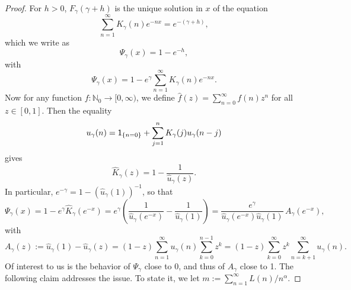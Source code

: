 \documentclass[AHL,Unicode,longabstracts]{cedram}
\newcommand{\bbN}{{\ensuremath{\mathbb N}}}
\newcommand{\ga}{\alpha}
\newcommand{\gga}{\gamma}
\newcommand{\ind}{{\sf 1}}
\newcommand{\hK}{\hat K}
\begin{document}
\begin{proof}
For $h > 0$, $F_\gga(\gga + h)$ is the unique solution in $x$ of the equation
\begin{equation}
\sum_{n=1}^\infty K_\gga(n) e^{- n x} = e^{- (\gga + h)},
\end{equation}
which we write as
\begin{equation}\label{FreeEnergyEquation}
\Psi_\gga(x) = 1 - e^{- h},
\end{equation}
with
\begin{equation}
\Psi_\gga(x) = 1 - e^\gga \sum_{n=1}^\infty K_\gga(n) e^{- n x}.
\end{equation}
Now for any function $f : \bbN_0 \to [0,\infty)$, we define $\hat f(z) = \sum_{n=0}^\infty f(n) z^n$ for all $z \in [0,1]$. Then the equality
\begin{equation}
u_\gga(n) = \ind_{\{n = 0\}} + \sum_{j=1}^n K_\gga(j) u_\gga(n-j)
\end{equation}
gives
\begin{equation}
\hK_\gga(z) = 1 - \frac{1}{\hat u_\gga(z)}.
\end{equation}
In particular, $e^{- \gga} = 1 - (\hat u_\gga(1))^{-1}$, so that
\begin{equation}\label{PsiAndA}
\Psi_\gga(x) = 1 - e^\gga \hK_\gga(e^{- x}) = e^\gga \left(\frac{1}{\hat u_\gga(e^{- x})} - \frac{1}{\hat u_\gga(1)} \right) = \frac{e^\gga}{\hat u_\gga(e^{- x}) \hat u_\gga(1)} \, A_\gga(e^{- x}),
\end{equation}
with
\begin{equation}
A_\gga(z) := \hat u_\gga(1) - \hat u_\gga(z) = (1 - z) \sum_{n=1}^\infty u_\gga(n) \sum_{k=0}^{n-1} z^k = (1 - z) \sum_{k=0}^\infty z^k \sum_{n=k+1}^\infty u_\gga(n).
\end{equation}
Of interest to us is the behavior of $\Psi_\gga$ close to 0, and thus of $A_\gga$ close to 1. The following claim addresses the issue. To state it, we let $m := \sum_{n=1}^\infty L(n)/n^\ga$.


\end{proof}
\end{document}

